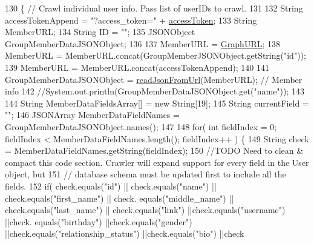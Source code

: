 \begin{DoxyCode}
130                                                                                                            
                        \{ \textcolor{comment}{// Crawl individual user info. Pass list of userIDs to crawl.}
131         
132         String accessTokenAppend = \textcolor{stringliteral}{"?access\_token="} + \hyperlink{classorg_1_1facebook_1_1crawler_1_1_facebook_json_parser_a31fa96aed58c0b5ab6a156224d88cc19}{accessToken};
133         String MemberURL;
134         String ID = \textcolor{stringliteral}{""};
135         JSONObject GroupMemberDataJSONObject;
136         
137         MemberURL = \hyperlink{classorg_1_1facebook_1_1crawler_1_1_facebook_json_parser_a432ef64a6d8e4575ff9e1f03a2fb1ab2}{GraphURL};
138         MemberURL = MemberURL.concat(GroupMemberJSONObject.getString(\textcolor{stringliteral}{"id"}));
139         MemberURL = MemberURL.concat(accessTokenAppend);
140         
141         GroupMemberDataJSONObject = \hyperlink{classorg_1_1facebook_1_1crawler_1_1_facebook_json_parser_ad27f29e060383659be657f065bd069c2}{readJsonFromUrl}(MemberURL); \textcolor{comment}{// Member info}
142         \textcolor{comment}{//System.out.println(GroupMemberDataJSONObject.get("name"));}
143 
144         String MemberDataFieldsArray[] = \textcolor{keyword}{new} String[19];
145         String currentField = \textcolor{stringliteral}{""};
146         JSONArray MemberDataFieldNames = GroupMemberDataJSONObject.names();
147 
148             \textcolor{keywordflow}{for}( \textcolor{keywordtype}{int} fieldIndex = 0; fieldIndex < MemberDataFieldNames.length(); fieldIndex++ ) \{
149                 String check = MemberDataFieldNames.getString(fieldIndex);
150                 \textcolor{comment}{//TODO Need to clean & compact this code section. Crawler will expand support for every
       field in the User object, but}
151                 \textcolor{comment}{// database schema must be updated first to include all the fields.}
152                 \textcolor{keywordflow}{if}( check.equals(\textcolor{stringliteral}{"id"}) || check.equals(\textcolor{stringliteral}{"name"}) || check.equals(\textcolor{stringliteral}{"first\_name"}) || check.
      equals(\textcolor{stringliteral}{"middle\_name"}) || check.equals(\textcolor{stringliteral}{"last\_name"}) || check.equals(\textcolor{stringliteral}{"link"}) ||check.equals(\textcolor{stringliteral}{"username"}) ||check.
      equals(\textcolor{stringliteral}{"birthday"}) ||check.equals(\textcolor{stringliteral}{"gender"}) ||check.equals(\textcolor{stringliteral}{"relationship\_status"}) ||check.equals(\textcolor{stringliteral}{"bio"}) ||check

\end{DoxyCode}
